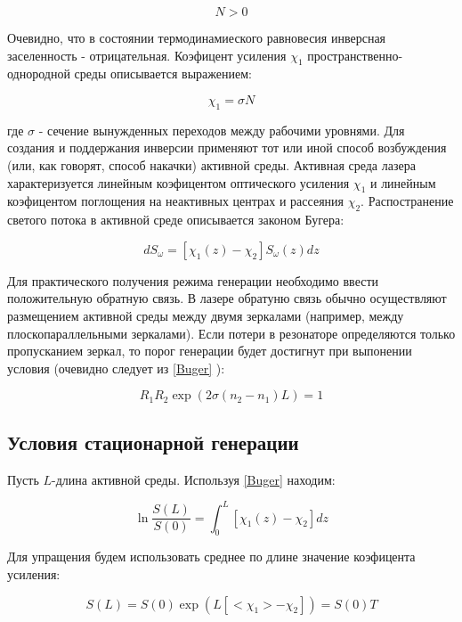 \documentclass[a4paper]{article}
\begin{document}
\begin{equation}
	N > 0
\end{equation}

Очевидно, что в состоянии термодинамиеского равновесия  инверсная заселенность - отрицательная. Коэфицент усиления $\chi_1$ пространственно-однородной среды описывается выражением:

\begin{equation}
	\chi_1 = \sigma N
\end{equation}

где $\sigma$ - сечение вынужденных переходов между рабочими уровнями. Для создания и поддержания инверсии применяют тот или иной способ возбуждения (или, как говорят, способ накачки) активной среды. Активная среда лазера характеризуется линейным коэфицентом оптического усиления $\chi_1$ и линейным коэфицентом поглощения на неактивных центрах и рассеяния $\chi_2$. Распостранение светого потока в активной среде описывается законом Бугера:

\begin{equation}
\label{Buger}
	dS_\omega = [\chi_1(z) - \chi_2] S_\omega (z)dz
\end{equation}

Для практического получения режима генерации необходимо ввести положительную обратную связь. В лазере обратуню связь обычно осуществляют размещением активной среды между двумя зеркалами (например, между плоскопараллельными зеркалами). Если потери в резонаторе определяются только пропусканием зеркал, то порог генерации будет достигнут при выпонении условия (очевидно следует из \ref{Buger} ):

\begin{equation}
	R_1 R_2 \exp(2 \sigma (n_2-n_1) L) = 1
\end{equation}

\subsection{Условия стационарной генерации}

Пусть $L$-длина активной среды. Используя \ref{Buger} находим:

\begin{equation}
	\ln\frac{S(L)}{S(0)} = \int_0^L[\chi_1(z)-\chi_2]dz
\end{equation}

Для упращения будем использовать среднее по длине значение коэфицента усиления:

\begin{equation}
	S(L) = S(0) \exp(L[ <\chi_1> - \chi_2 ]) = S(0)T
\end{equation}
\end{document}
